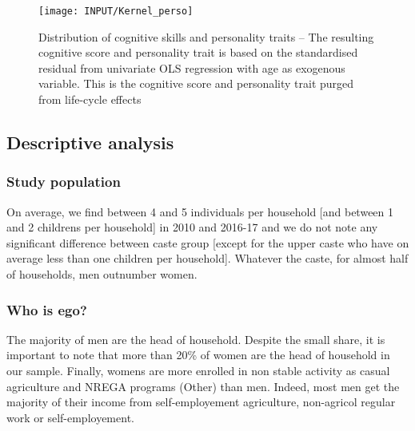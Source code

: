 \documentclass[a4paper, 11pt, onecolumn]{article}
\begin{document}

\begin{figure}[ht]
\raggedright
\texttt{[image: INPUT/Kernel\_perso]}
\caption{Distribution of cognitive skills and personality traits -- The resulting cognitive score and personality trait is based on the standardised residual from univariate OLS regression with age as exogenous variable. This is the cognitive score and personality trait purged from life-cycle effects}
\label{figure:EGOscore}
\end{figure}





	\subsection{Descriptive analysis}

		\subsubsection{Study population}
		


On average, we find between 4 and 5 individuals per household [and between 1 and 2 childrens per household] in 2010 and 2016-17 and we do not note any significant difference between caste group [except for the upper caste who have on average less than one children per household].
Whatever the caste, for almost half of households, men outnumber women. 




		\subsubsection{Who is ego?}
		
%


The majority of men are the head of household.%
Despite the small share, it is important to note that more than 20\% of women are the head of household in our sample.
Finally, womens are more enrolled in non stable activity as casual agriculture and NREGA programs (Other) than men.
Indeed, most men get the majority of their income from self-employement agriculture, non-agricol regular work or self-employement.
\end{document}
